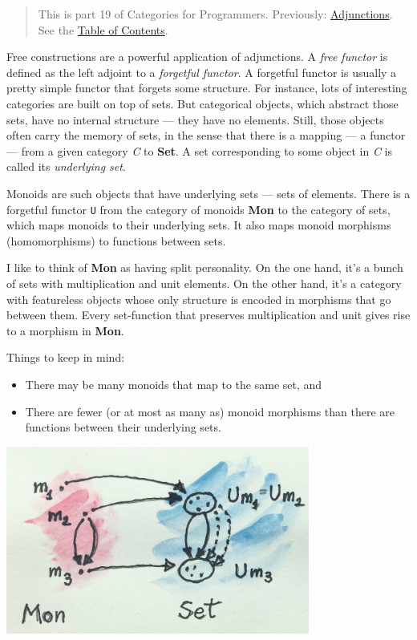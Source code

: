 \begin{quote}
This is part 19 of Categories for Programmers. Previously:
\href{https://bartoszmilewski.com/2016/04/18/adjunctions/}{Adjunctions}.
See the
\href{https://bartoszmilewski.com/2014/10/28/category-theory-for-programmers-the-preface/}{Table
of Contents}.
\end{quote}

Free constructions are a powerful application of adjunctions. A
\emph{free functor} is defined as the left adjoint to a \emph{forgetful
functor}. A forgetful functor is usually a pretty simple functor that
forgets some structure. For instance, lots of interesting categories are
built on top of sets. But categorical objects, which abstract those
sets, have no internal structure --- they have no elements. Still, those
objects often carry the memory of sets, in the sense that there is a
mapping --- a functor --- from a given category \emph{C} to
\textbf{Set}. A set corresponding to some object in \emph{C} is called
its \emph{underlying set}.

Monoids are such objects that have underlying sets --- sets of elements.
There is a forgetful functor \texttt{U} from the category of monoids
\textbf{Mon} to the category of sets, which maps monoids to their
underlying sets. It also maps monoid morphisms (homomorphisms) to
functions between sets.

I like to think of \textbf{Mon} as having split personality. On the one
hand, it's a bunch of sets with multiplication and unit elements. On the
other hand, it's a category with featureless objects whose only
structure is encoded in morphisms that go between them. Every
set-function that preserves multiplication and unit gives rise to a
morphism in \textbf{Mon}.

Things to keep in mind:

\begin{itemize}
\tightlist
\item
  There may be many monoids that map to the same set, and
\item
  There are fewer (or at most as many as) monoid morphisms than there
  are functions between their underlying sets.
\end{itemize}

\hypertarget{attachment_5532}{}
\includegraphics[width=3.92708in]{images/forgetful.jpg}


